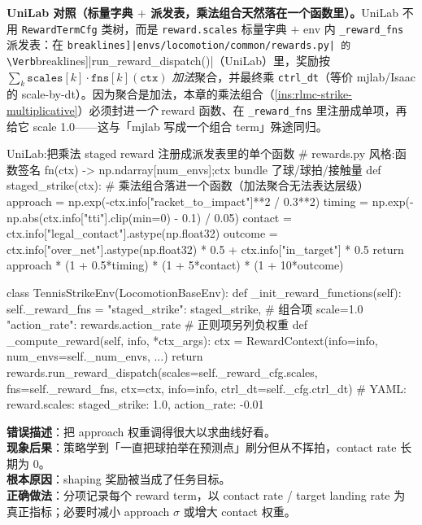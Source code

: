 \textbf{UniLab 对照（标量字典 $+$ 派发表，乘法组合天然落在一个函数里）。}UniLab 不用 \verb|RewardTermCfg| 类树，而是 \verb|reward.scales| 标量字典 $+$ env 内 \verb|_reward_fns| 派发表：在 \Verb[breaklines]|envs/locomotion/common/rewards.py| 的 \Verb[breaklines]|run_reward_dispatch()|（UniLab）里，奖励按 $\sum_k \texttt{scales}[k]\cdot\texttt{fns}[k](\texttt{ctx})$ \emph{加法}聚合，并最终乘 \verb|ctrl_dt|（等价 mjlab/Isaac 的 scale-by-dt）。因为聚合是加法，本章的乘法组合（\cref{ins:rlmc-strike-multiplicative}）必须封进\emph{一个} reward 函数、在 \verb|_reward_fns| 里注册成单项，再给它 scale 1.0——这与「mjlab 写成一个组合 term」殊途同归。

\begin{codebox}[Python]{UniLab:把乘法 staged reward 注册成派发表里的单个函数}
# rewards.py 风格:函数签名 fn(ctx) -> np.ndarray[num_envs];ctx bundle 了球/球拍/接触量
def staged_strike(ctx):                     # 乘法组合落进一个函数（加法聚合无法表达层级）
    approach = np.exp(-ctx.info["racket_to_impact"]**2 / 0.3**2)
    timing   = np.exp(-np.abs(ctx.info["tti"].clip(min=0) - 0.1) / 0.05)
    contact  = ctx.info["legal_contact"].astype(np.float32)
    outcome  = ctx.info["over_net"].astype(np.float32) * 0.5 + ctx.info["in_target"] * 0.5
    return approach * (1 + 0.5*timing) * (1 + 5*contact) * (1 + 10*outcome)

class TennisStrikeEnv(LocomotionBaseEnv):
    def _init_reward_functions(self):
        self._reward_fns = {"staged_strike": staged_strike,           # 组合项 scale=1.0
                            "action_rate": rewards.action_rate}        # 正则项另列负权重
    def _compute_reward(self, info, *ctx_args):
        ctx = RewardContext(info=info, num_envs=self._num_envs, ...)
        return rewards.run_reward_dispatch(scales=self._reward_cfg.scales,
            fns=self._reward_fns, ctx=ctx, info=info, ctrl_dt=self._cfg.ctrl_dt)
# YAML: reward.scales: {staged_strike: 1.0, action_rate: -0.01}
\end{codebox}

\begin{pitfall}
\textbf{错误描述}：把 approach 权重调得很大以求曲线好看。\\
\textbf{现象后果}：策略学到「一直把球拍举在预测点」刷分但从不挥拍，contact rate 长期为 0。\\
\textbf{根本原因}：shaping 奖励被当成了任务目标。\\
\textbf{正确做法}：分项记录每个 reward term，以 contact rate / target landing rate 为真正指标；必要时减小 approach $\sigma$ 或增大 contact 权重。
\end{pitfall}

